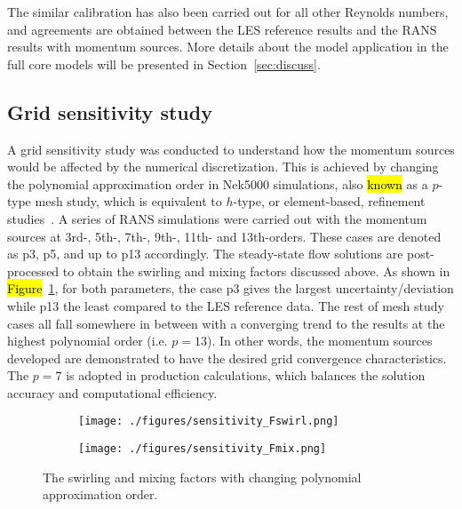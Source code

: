 The similar calibration has also been carried out for all other Reynolds numbers, and agreements are obtained between the LES reference results and the RANS results with momentum sources.
More details about the model application in the full core models will be presented in Section~\ref{sec:discuss}.

\subsection{Grid sensitivity study}
\label{sec:msm3}

A grid sensitivity study was conducted to understand how the momentum sources would be affected by the numerical discretization.
This is achieved by changing the polynomial approximation order in Nek5000 simulations, also \hl{known} as a $p$-type mesh study, which is equivalent to $h$-type, or element-based, refinement studies~\citep{Shaver2019}.
A series of RANS simulations were carried out with the momentum sources at 3rd-, 5th-, 7th-, 9th-, 11th- and 13th-orders.
These cases are denoted as p3, p5, and up to p13 accordingly.
The steady-state flow solutions are post-processed to obtain the swirling and mixing factors discussed above.
As shown in \hl{Figure}~\ref{fig:sensitivity}, for both parameters, the case p3 gives the largest uncertainty/deviation while p13 the least compared to the LES reference data.
The rest of mesh study cases all fall somewhere in between with a converging trend to the results at the highest polynomial order (i.e.
$p=13$).
In other words, the momentum sources developed are demonstrated to have the desired grid convergence characteristics.
The $p=7$ is adopted in production calculations, which balances the solution accuracy and computational efficiency.

\begin{figure}
\centering
\begin{subfigure}{.5\textwidth}
  \centering
  \texttt{[image: ./figures/sensitivity\_Fswirl.png]}
\end{subfigure}%
\begin{subfigure}{.5\textwidth}
  \centering
  \texttt{[image: ./figures/sensitivity\_Fmix.png]}
\end{subfigure}
\caption{The swirling and mixing factors with changing polynomial approximation order.}
\label{fig:sensitivity}
\end{figure}
